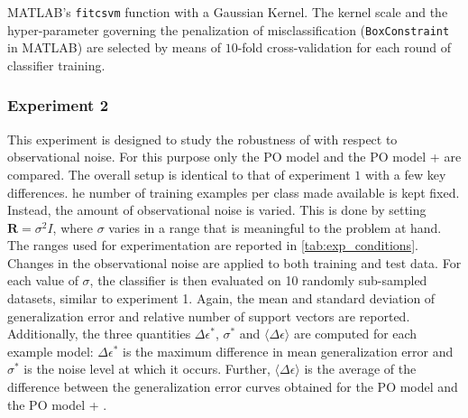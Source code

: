 {%
 MATLAB's {\tt fitcsvm} function with a Gaussian Kernel.
The kernel scale and the hyper-parameter governing the penalization of misclassification ({\tt BoxConstraint} in MATLAB) are selected by means of $10$-fold cross-validation for each round of classifier training.

\subsubsection{Experiment 2}
This experiment is designed to study the robustness of \myMethod{} with respect to observational noise.
For this purpose only the PO model and the PO model + \myMethod{} are compared.
The overall setup is identical to that of experiment $1$ with a few key differences.
he number of training examples per class made available is kept fixed. 
Instead, the amount of observational noise is varied.
This is done by setting $\mathbf{R} = \sigma^2 I$, where $\sigma$ varies in a range that is meaningful to the problem at hand.
The ranges used for experimentation are reported in \autoref{tab:exp_conditions}.
Changes in the observational noise are applied to both training and test data.
For each value of $\sigma$, the classifier is then evaluated on 10 randomly sub-sampled datasets, similar to experiment 1.
Again, the mean and standard deviation of generalization error and relative number of support vectors are reported.
Additionally, the three quantities $\Delta \epsilon^{\ast}$, $\sigma^{\ast}$ and $\langle \Delta \epsilon \rangle$ are computed for each example model:
$\Delta \epsilon^{\ast}$ is the maximum difference in mean generalization error and $\sigma^{\ast}$ is the noise level at which it occurs.
Further, $\langle \Delta \epsilon \rangle$ is the average of the difference between the generalization error curves obtained for the PO model and the PO model + \myMethod{}.

}
